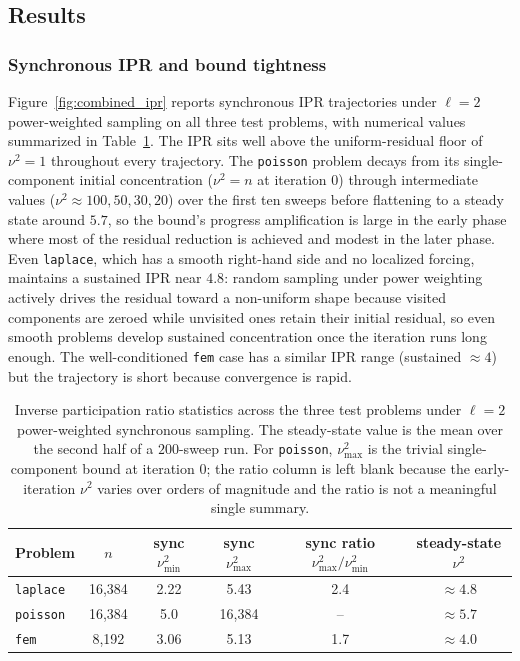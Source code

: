 \documentclass[pdflatex,sn-mathphys-num]{sn-jnl}%
\theoremstyle{thmstyleone}%
\theoremstyle{thmstyletwo}%
\theoremstyle{thmstylethree}%
\begin{document}
\subsection{Results}
\label{sec:experiments:results}

\subsubsection*{Synchronous IPR and bound tightness}

Figure~\ref{fig:combined_ipr} reports synchronous IPR trajectories under
$\ell = 2$ power-weighted sampling on all three test problems, with
numerical values summarized in Table~\ref{tab:ipr-summary}. The IPR sits
well above the uniform-residual floor of $\nu^2 = 1$ throughout every
trajectory. The \texttt{poisson} problem decays from its single-component
initial concentration ($\nu^2 = n$ at iteration $0$) through intermediate
values ($\nu^2 \approx 100, 50, 30, 20$) over the first ten sweeps before
flattening to a steady state around $5.7$, so the bound's progress
amplification is large in the early phase where most of the residual
reduction is achieved and modest in the later phase. Even \texttt{laplace},
which has a smooth right-hand side and no localized forcing, maintains a
sustained IPR near $4.8$: random sampling under power weighting actively
drives the residual toward a non-uniform shape because visited components
are zeroed while unvisited ones retain their initial residual, so even
smooth problems develop sustained concentration once the iteration runs
long enough. The well-conditioned \texttt{fem} case has a similar IPR
range (sustained $\approx 4$) but the trajectory is short because
convergence is rapid.

\begin{table}[ht]
\centering
\small
\begin{tabular}{lccccc}
\toprule
Problem & $n$ & sync $\nu^2_{\min}$ & sync $\nu^2_{\max}$ &
sync ratio $\nu^2_{\max}/\nu^2_{\min}$ & steady-state $\nu^2$ \\
\midrule
\texttt{laplace} & 16{,}384 & 2.22  & 5.43      & 2.4  & $\approx 4.8$ \\
\texttt{poisson} & 16{,}384 & 5.0   & 16{,}384  & --   & $\approx 5.7$ \\
\texttt{fem}     & 8{,}192  & 3.06  & 5.13      & 1.7  & $\approx 4.0$ \\
\bottomrule
\end{tabular}
\caption{Inverse participation ratio statistics across the three test
problems under $\ell = 2$ power-weighted synchronous sampling. The
steady-state value is the mean over the second half of a $200$-sweep
run. For \texttt{poisson}, $\nu^2_{\max}$ is the trivial single-component
bound at iteration $0$; the ratio column is left blank because the
early-iteration $\nu^2$ varies over orders of magnitude and the ratio is
not a meaningful single summary.}
\label{tab:ipr-summary}
\end{table}
\end{document}
